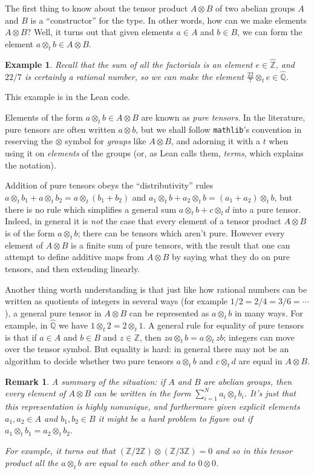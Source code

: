 \documentclass[10pt,a4paper]{article}
\newcommand{\Z}{\mathbb{Z}}
\newcommand{\Q}{\mathbb{Q}}
\newcommand{\Qhat}{\widehat{\Q}}
\newcommand{\Zhat}{\widehat{\Z}}
\newtheorem{remark}[theorem]{Remark}
\newtheorem{example}[theorem]{Example}
\begin{document}
The first thing to know about the tensor product $A\otimes B$ of two abelian groups $A$ and $B$
is a ``constructor'' for the type. In other words, how can we make elements $A\otimes B$?
Well, it turns out that given elements $a\in A$ and $b\in B$, we can form the element
$a\otimes_t b\in A\otimes B$.

\begin{example} Recall that the sum of all the factorials is an element $e\in\Zhat$, and $22/7$ is certainly
a rational number, so we can make the element $\frac{22}{7}\otimes_te\in\Qhat$.
\end{example}

This example is in the Lean code.

Elements of the form $a\otimes_t b\in A\otimes B$ are known as \emph{pure tensors}. In the
literature, pure tensors
are often written $a\otimes b$, but we shall follow {\tt mathlib}'s convention in reserving
the $\otimes$ symbol for \emph{groups} like $A \otimes B$, and adorning it with a $t$ when
using it on \emph{elements} of the groups (or, as Lean calls them, \emph{terms}, which explains
the notation).

Addition of pure tensors obeys the ``distributivity'' rules
$a\otimes_t b_1+a\otimes_t b_2=a\otimes_t(b_1+b_2)$ and
$a_1\otimes_t b+a_2\otimes_t b=(a_1+a_2)\otimes_t b$, but there is no rule which simplifies
a general sum $a\otimes_t b + c\otimes_t d$ into a pure tensor. Indeed, in general it is \emph{not}
the case that every element of a tensor product $A\otimes B$ is of the form $a\otimes_t b$; there can be
tensors which aren't pure. However every element of $A\otimes B$ is a finite sum of pure tensors,
with the result that one can attempt to define additive maps from $A\otimes B$ by saying what they
do on pure tensors, and then extending linearly.

Another thing worth understanding is that just like how rational numbers can be written as
quotients of integers in several ways (for example $1/2=2/4=3/6=\cdots$), a general pure tensor
in $A\otimes B$ can be represented as $a\otimes_t b$ in many ways. For example, in $\Qhat$
we have $1\otimes_t 2=2\otimes_t 1$. A general rule for equality of pure tensors is that if
$a\in A$ and $b\in B$ and $z\in\Z$, then $za\otimes_tb=a\otimes_tzb$; integers can move over the
tensor symbol. But equality is hard: in general there may not be an algorithm to decide
whether two pure tensors $a\otimes_t b$ and $c\otimes_t d$ are equal in $A\otimes B$.

\begin{remark} A summary of the situation: if $A$ and $B$ are abelian groups, then every element
    of $A\otimes B$ can be written in the form $\sum_{i=1}^Na_i\otimes_tb_i$. It's just that this
    representation is highly nonunique, and furthermore given explicit elements $a_1,a_2\in A$
    and $b_1,b_2\in B$ it might be a hard problem to figure out if
    $a_1\otimes_t b_1=a_2\otimes_t b_2$.

    For example, it turns out that $(\Z/2\Z)\otimes(\Z/3\Z)=0$
    and so in this tensor product all the $a\otimes_t b$ are equal to each other and to $0\otimes 0$.
\end{remark}
\end{document}
